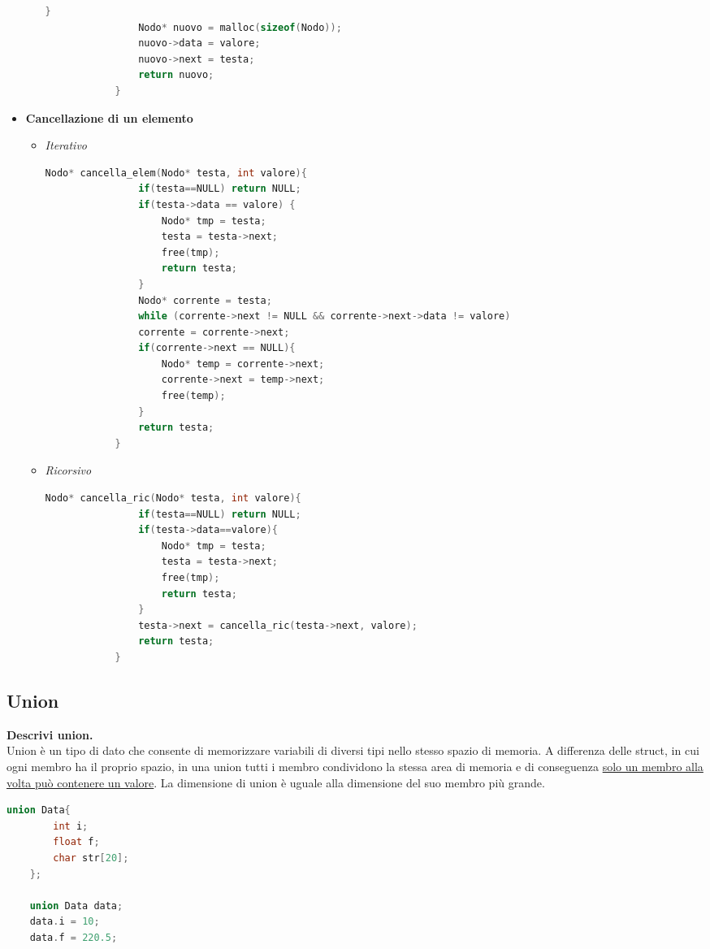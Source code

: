 \begin{itemize}
\begin{itemize}
\begin{lstlisting}[language=C]
				}
				Nodo* nuovo = malloc(sizeof(Nodo));
				nuovo->data = valore;
				nuovo->next = testa;
				return nuovo;
			}
		\end{lstlisting}
	\end{itemize}
	\item \textbf{Cancellazione di un elemento}
	\begin{itemize}
		\item \textit{Iterativo}
		\begin{lstlisting}[language=C]
			Nodo* cancella_elem(Nodo* testa, int valore){
				if(testa==NULL) return NULL;
				if(testa->data == valore) {
					Nodo* tmp = testa;
					testa = testa->next;
					free(tmp);
					return testa;
				}
				Nodo* corrente = testa;
				while (corrente->next != NULL && corrente->next->data != valore)
				corrente = corrente->next;
				if(corrente->next == NULL){
					Nodo* temp = corrente->next;
					corrente->next = temp->next;
					free(temp);
				}
				return testa;
			}
		\end{lstlisting}
		\item \textit{Ricorsivo}
		\begin{lstlisting}[language=C]
			Nodo* cancella_ric(Nodo* testa, int valore){
				if(testa==NULL) return NULL;
				if(testa->data==valore){
					Nodo* tmp = testa;
					testa = testa->next;
					free(tmp);
					return testa;
				}
				testa->next = cancella_ric(testa->next, valore);
				return testa;
			}
		\end{lstlisting}
	\end{itemize}
\end{itemize}
\subsection{Union}
\textbf{Descrivi union.}\\
Union è un tipo di dato che consente di memorizzare variabili di diversi tipi nello stesso spazio di memoria. A differenza delle struct, in cui ogni membro ha il proprio spazio, in una union tutti i membro condividono la stessa area di memoria e di conseguenza \underline{solo un membro alla volta può contenere un valore}. La dimensione di union è uguale alla dimensione del suo membro più grande.
\begin{lstlisting}[language=C]
	union Data{
		int i;
		float f;
		char str[20];
	};
	
	union Data data;        
	data.i = 10;
	data.f = 220.5;
\end{lstlisting}